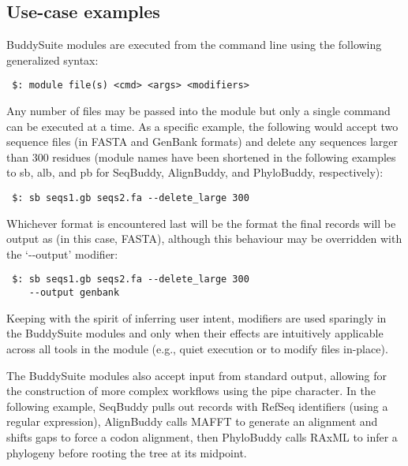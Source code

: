 \documentclass[twocolumn]{bmcart}%
\begin{document}
\subsection*{Use-case examples}
BuddySuite modules are executed from the command line using the following generalized syntax:

\smallskip

\begin{verbatim}
 $: module file(s) <cmd> <args> <modifiers>
\end{verbatim}

\smallskip

Any number of files may be passed into the module but only a single command can be executed at a time. As a specific example, the following would accept two sequence files (in FASTA and GenBank formats) and delete any sequences larger than 300 residues (module names have been shortened in the following examples to sb, alb, and pb for SeqBuddy, AlignBuddy, and PhyloBuddy, respectively):

\smallskip

\begin{verbatim}
 $: sb seqs1.gb seqs2.fa --delete_large 300
\end{verbatim}

\smallskip

Whichever format is encountered last will be the format the final records will be output as (in this case, FASTA), although this behaviour may be overridden with the `-{}-output' modifier:

\smallskip

\begin{verbatim}
 $: sb seqs1.gb seqs2.fa --delete_large 300 
    --output genbank
\end{verbatim}

\smallskip

Keeping with the spirit of inferring user intent, modifiers are used sparingly in the BuddySuite modules and only when their effects are intuitively applicable across all tools in the module (e.g., quiet execution or to modify files in-place).

The BuddySuite modules also accept input from standard output, allowing for the construction of more complex workflows using the pipe character. In the following example, SeqBuddy pulls out records with RefSeq identifiers (using a regular expression), AlignBuddy calls MAFFT to generate an alignment and shifts gaps to force a codon alignment, then PhyloBuddy calls RAxML to infer a phylogeny before rooting the tree at its midpoint.
\end{document}
